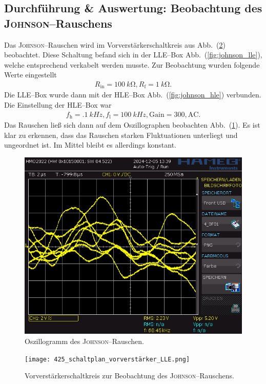 \documentclass[sn-mathphys-num,iicol]{sn-jnl}
\theoremstyle{thmstyleone}
\theoremstyle{thmstyletwo}
\theoremstyle{thmstylethree}
\begin{document}
\subsection{Durchführung \& Auswertung: Beobachtung des \textsc{Johnson}--Rauschens}
Das \textsc{Johnson}--Rauschen wird im Vorverstärkerschaltkreis aus Abb.\ (\ref{fig:vorverstärker}) beobachtet.
Diese Schaltung befand sich in der LLE--Box Abb.\ (\ref{fig:johnson_lle}), welche entsprechend verkabelt werden musste.
Zur Beobachtung wurden folgende Werte eingestellt
\begin{align} 
        R_\text{in}=\SI{100}{k\ohm},R_\text{f}=\SI{1}{k\ohm}
.\end{align} 
Die LLE--Box wurde dann mit der HLE--Box Abb.\ (\ref{fig:johnson_hle}) verbunden.
Die Einstellung der HLE--Box war
\begin{align} 
        f_\text{h}=\SI{.1}{kHz},f_\text{l}=\SI{100}{kHz},\text{Gain}=300,\text{AC}
.\end{align} 
Das Rauschen ließ sich dann auf dem Oszillographen beobachten Abb.\ (\ref{fig:johnson_oszi}).
Es ist klar zu erkennen, dass das Rauschen starken Fluktuationen unterliegt und ungeordnet ist.
Im Mittel bleibt es allerdings konstant.

\begin{figure}[t]
        \centering
        \includegraphics[width=.5\textwidth]{../data/4_0F01.png}
        \caption{Oszillogramm des \textsc{Johnson}--Rauschen.} \label{fig:johnson_oszi}
\end{figure}

\begin{figure}[t]
        \centering
        \texttt{[image: 425\_schaltplan\_vorverstärker\_LLE.png]}
        \caption{Vorverstärkerschaltkreis zur Beobachtung des \textsc{Johnson}--Rauschens.\cite{anleitung425}} \label{fig:vorverstärker}
\end{figure}
\end{document}
